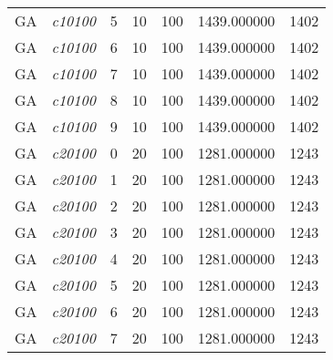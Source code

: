 {\begin{longtable}{cc|c|cc|cc}
			GA                 & \textit{c10100}    & 5                               & 10               & 100              & 1439.000000                          & 1402 \\  
			GA                 & \textit{c10100}    & 6                               & 10               & 100              & 1439.000000                          & 1402 \\  
			GA                 & \textit{c10100}    & 7                               & 10               & 100              & 1439.000000                          & 1402 \\  
			GA                 & \textit{c10100}    & 8                               & 10               & 100              & 1439.000000                          & 1402 \\  
			GA                 & \textit{c10100}    & 9                               & 10               & 100              & 1439.000000                          & 1402 \\  \hline
			GA                 & \textit{c20100}    & 0                               & 20               & 100              & 1281.000000                          & 1243 \\  
			GA                 & \textit{c20100}    & 1                               & 20               & 100              & 1281.000000                          & 1243 \\  
			GA                 & \textit{c20100}    & 2                               & 20               & 100              & 1281.000000                          & 1243 \\  
			GA                 & \textit{c20100}    & 3                               & 20               & 100              & 1281.000000                          & 1243 \\  
			GA                 & \textit{c20100}    & 4                               & 20               & 100              & 1281.000000                          & 1243 \\  
			GA                 & \textit{c20100}    & 5                               & 20               & 100              & 1281.000000                          & 1243 \\  
			GA                 & \textit{c20100}    & 6                               & 20               & 100              & 1281.000000                          & 1243 \\  
			GA                 & \textit{c20100}    & 7                               & 20               & 100              & 1281.000000                          & 1243 \\  

\end{longtable}}
